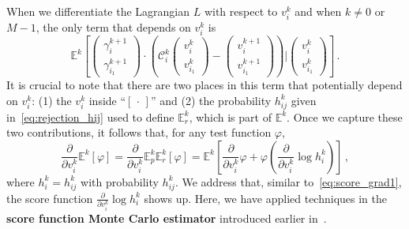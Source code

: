 \documentclass[12pt]{amsart}
\newcommand{\cC}{\mathcal C} \newcommand{\cD}{\mathcal D}
\begin{document}
When we differentiate the Lagrangian $L$ with respect to $v_i^k$ and when $k\neq 0$ or $M-1$, the only term that depends on $v_i^k$ is
\[
\mathbb{E}^k \left[   \begin{pmatrix} \gamma_i^{k+1} \\ \gamma_{i_1}^{k+1} \end{pmatrix} \cdot  \left( \cC_{i}^k \begin{pmatrix} v_i^k \\ v_{i_1}^k \end{pmatrix} - \begin{pmatrix} v_i^{k+1} \\ v_{i_1}^{k+1} \end{pmatrix} \right)   \bigg| \begin{pmatrix} v_i^k \\ v_{i_1}^k \end{pmatrix} \right] \,.
\]
It is crucial to note that there are two places in this term that potentially depend on $v_i^k$: (1) the $v_i^k$ inside ``$[\,\cdot\,]$'' and (2) the probability $h_{ij}^k$ given in~\eqref{eq:rejection_hij} used to define $\mathbb{E}_r^k$, which is part of $\mathbb{E}^k$. Once we capture these two contributions, it follows that, for any test function $\varphi$,
\begin{equation}\label{eq:phi_diff_final}
    \frac{\partial}{\partial v_i^k}  \mathbb{E}^k [ \varphi  ]   =  \frac{\partial}{\partial v_i^k}  \mathbb{E}_{p}^k \mathbb{E}_{r}^k [ \varphi  ]  = 
    \mathbb{E}^k \left[ \frac{\partial}{\partial v_i^k}  \varphi + \varphi \left(\frac{\partial}{\partial v_i^k} \log h_i^k \right) \right]\,,
\end{equation}
where $h_i^k = h_{ij}^k$ with probability $h_{ij}^k$. We address that, similar to~\eqref{eq:score_grad1}, the score function $\frac{\partial}{\partial v_i^k} \log h_i^k$ shows up. Here, we have applied techniques in the \textbf{score function Monte Carlo estimator} introduced earlier in~.
\end{document}
